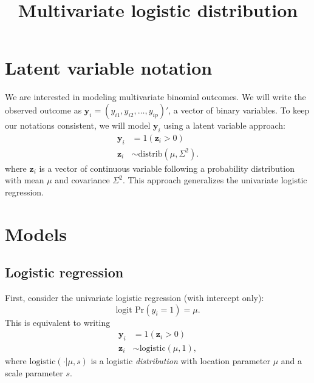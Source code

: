 \documentclass{article}\usepackage[]{graphicx}\usepackage[]{color}
\title{Multivariate logistic distribution}
\begin{document}
\maketitle

\section{Latent variable notation}

We are interested in modeling multivariate binomial outcomes. We will write the observed outcome as $\mathbf y_i = (y_{i1}, y_{i2}, \dots, y_{ip})'$, a vector of binary variables. To keep our notations consistent, we will model $\mathbf y_i$ using a latent variable approach:
\begin{equation}
\begin{aligned}
\mathbf y_i &= 1(\mathbf z_i > 0)\\
\mathbf z_i &\sim \mathrm{distrib}(\mu, \Sigma^2).
\end{aligned}
\end{equation}
where $\mathbf z_i$ is a vector of continuous variable following a probability distribution with mean $\mu$ and covariance $\Sigma^2$.
This approach generalizes the univariate logistic regression.

\section{Models}

\subsection{Logistic regression}

First, consider the univariate logistic regression (with intercept only):
\begin{equation}
\textrm{logit Pr}(y_i = 1) = \mu.
\end{equation}
This is equivalent to writing
\begin{equation}
\begin{aligned}
\mathbf y_i &= 1(\mathbf z_i > 0)\\
\mathbf z_i &\sim \mathrm{logistic}(\mu, 1),
\end{aligned}
\end{equation}
where $\mathrm{logistic}(\cdot|\mu, s)$ is a logistic \emph{distribution} with location parameter $\mu$ and a scale parameter $s$.
\end{document}
